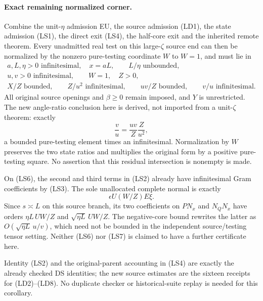 \paragraph{Exact remaining normalized corner.}
Combine the unit-$\eta$ admission EU, the source admission (LD1),
the state admission (LS1), the direct exit (LS4), the half-core exit
and the inherited remote theorem. Every unadmitted real test on this
large-$\zeta$ source end can then be normalized by the nonzero
pure-testing coordinate $W$ to $W=1$, and must lie in
\[
\begin{gathered}
 a,L,\eta>0\text{ infinitesimal},\quad x=aL,
       \qquad L/\eta\text{ unbounded},\\
 u,v>0\text{ infinitesimal},\qquad W=1,\quad Z>0,\\
 X/Z\text{ bounded},\qquad Z/u^2\text{ infinitesimal},
             \qquad uv/Z\text{ bounded},\qquad v/u\text{ infinitesimal}.
\end{gathered}                                                     \tag{LS6}
\]
All original source openings and $\beta\ge0$ remain imposed, and
$Y$ is unrestricted. The new angle-ratio conclusion here is derived,
not imported from a unit-$\zeta$ theorem: exactly
\[
                 \frac vu=\frac{uv}{Z}\frac{Z}{u^2},
\]
a bounded pure-testing element times an infinitesimal. Normalization
by $W$ preserves the two state ratios and multiplies the original
form by a positive pure-testing square. No assertion that this
residual intersection is nonempty is made.

On (LS6), the second and third terms in (LS2) already have
infinitesimal Gram coefficients by (LS3). The sole unallocated
complete normal is exactly
\[
                         \epsilon U(W/Z)E\xi.          \tag{LS7}
\]
Since $s\asymp L$ on this source branch, its two coefficients on
$PN_x$ and $N_QN_x$ have orders
$\eta L\,UW/Z$ and $\sqrt{\eta L}\,UW/Z$.
The negative-core bound rewrites the latter as
$O(\sqrt{\eta L}\,u/v)$, which need not be bounded in the
independent source/testing tensor setting. Neither (LS6) nor
(LS7) is claimed to have a further certificate here.

Identity (LS2) and the original-parent accounting in (LS4) are exactly
the already checked DS identities; the new source estimates are
the sixteen receipts for (LD2)--(LD8). No duplicate checker or
historical-suite replay is needed for this corollary.

